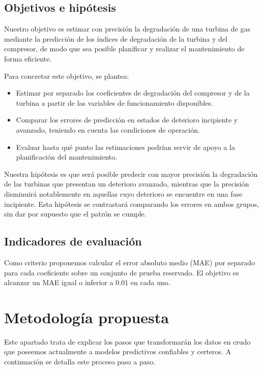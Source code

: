 \documentclass[a4paper]{article}
\begin{document}
\subsection{Objetivos e hipótesis}
Nuestro objetivo es estimar con precisión la degradación de una turbina de gas mediante la predicción de los índices de degradación de la turbina y del compresor, de modo que sea posible planificar y realizar el mantenimiento de forma eficiente.

Para concretar este objetivo, se plantea:
\begin{itemize}
  \item Estimar por separado los coeficientes de degradación del compresor y de la turbina a partir de las variables de funcionamiento disponibles.
  \item Comparar los errores de predicción en estados de deterioro incipiente y avanzado, teniendo en cuenta las condiciones de operación.
  \item Evaluar hasta qué punto las estimaciones podrían servir de apoyo a la planificación del mantenimiento.
\end{itemize}

Nuestra hipótesis es que será posible predecir con mayor precisión la degradación de las turbinas que presentan un deterioro avanzado, mientras que la precisión disminuirá notablemente en aquellas cuyo deterioro se encuentre en una fase incipiente. Esta hipótesis se contrastará comparando los errores en ambos grupos, sin dar por supuesto que el patrón se cumple.

\subsection{Indicadores de evaluación}
Como criterio proponemos calcular el error absoluto medio (MAE) por separado para cada coeficiente sobre un conjunto de prueba reservado. El objetivo es alcanzar un MAE igual o inferior a $0.01$ en cada uno.

\section{Metodología propuesta}
  Este apartado trata de explicar los pasos que transformarán los datos en crudo que poseemos actualmente a modelos predictivos confiables y certeros. A continuación se detalla este proceso paso a paso.
\end{document}

